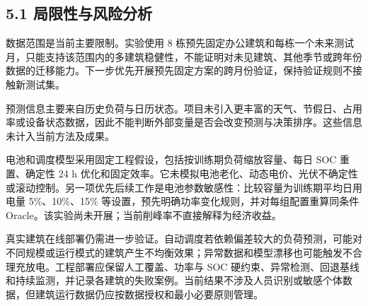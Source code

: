 \documentclass[12pt,a4paper]{article}
\begin{document}
\subsection{5.1 局限性与风险分析}
数据范围是当前主要限制。实验使用 8 栋预先固定办公建筑和每栋一个未来测试月，只能支持该范围内的多建筑稳健性，不能证明对未见建筑、其他季节或跨年份数据的迁移能力。下一步优先开展预先固定方案的跨月份验证，保持验证规则不接触新测试集。\par
预测信息主要来自历史负荷与日历状态。项目未引入更丰富的天气、节假日、占用率或设备状态数据，因此不能判断外部变量是否会改变预测与决策排序。这些信息未计入当前方法及成果。\par
电池和调度模型采用固定工程假设，包括按训练期负荷缩放容量、每日 SOC 重置、确定性 24 h 优化和固定效率。它未模拟电池老化、动态电价、光伏不确定性或滚动控制。另一项优先后续工作是电池参数敏感性：比较容量为训练期平均日用电量 5\%、10\%、15\% 等设置，预先明确功率变化规则，并对每组配置重算同条件 Oracle。该实验尚未开展；当前削峰率不直接解释为经济收益。\par
真实建筑在线部署仍需进一步验证。自动调度若依赖偏差较大的负荷预测，可能对不同规模或运行模式的建筑产生不均衡效果；异常数据和模型漂移也可能触发不合理充放电。工程部署应保留人工覆盖、功率与 SOC 硬约束、异常检测、回退基线和持续监测，并记录各建筑的失败案例。当前结果不涉及人员识别或敏感个体数据，但建筑运行数据仍应按数据授权和最小必要原则管理。\par
\clearpage\fontsize{10.5}{20}\selectfont\setlength{\parindent}{0pt}
\end{document}
